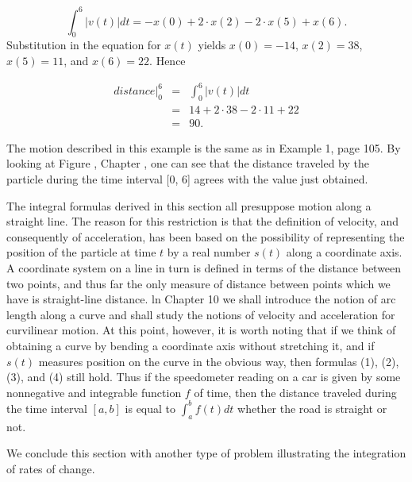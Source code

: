 \begin{example}
$$
\int_{0}^{6} |v(t)| dt = -x(0) + 2 \cdot x(2) - 2 \cdot x(5) + x(6).  
$$
\noindent Substitution in the equation for $x(t)$ yields $x(0) = - 14$, $x(2)= 38$, $x(5) = 11$, and $x(6) = 22$.  Hence

\begin{eqnarray*} 
distance \Big|_{0}^{6} &=& \int_{0}^{6} |v(t)| dt \\
                   &=& 14 + 2 \cdot 38 - 2 \cdot 11 + 22 \\
                   &=& 90.
\end{eqnarray*}

The motion described in this example is the same as in Example 1, page 105. By looking at Figure , Chapter ,
one can see that the distance traveled by the particle during the time interval [0, 6] agrees with the value just obtained.
\end{example}
\medskip

The integral formulas derived in this section all presuppose motion along a straight line. The reason for this restriction is that the definition of velocity, and consequently of acceleration, has been based on the possibility of representing the position of the particle at time $t$ by a real number $s(t)$ along a coordinate axis. A coordinate system on a line in turn is defined in terms of the distance between two points, and thus far the only measure of distance between points which we have is straight-line distance. ln Chapter 10 we shall introduce the notion of arc length along a curve and shall study the notions of velocity and acceleration for curvilinear motion. At this point, however, it is worth noting that if we think of obtaining a curve by bending a coordinate axis without stretching it, and if $s(t)$ measures position on the curve in the obvious way, then formulas (1), (2), (3), and (4) still hold. Thus if the speedometer reading on a car is given by some nonnegative and integrable function $f$ of time, then the distance traveled during the time interval $[a, b]$ is equal to $\int_{a}^{b} f(t) dt$ whether the road is straight or not.

We conclude this section with another type of problem illustrating the integration of rates of change.

